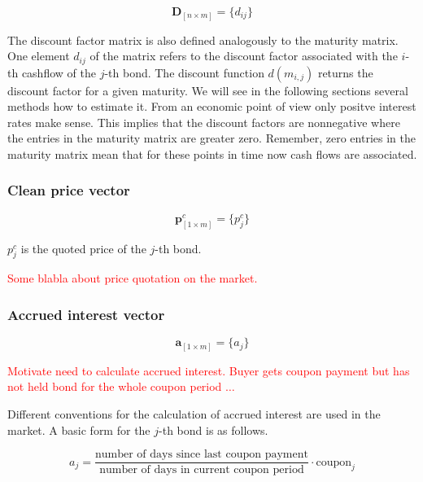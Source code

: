  \begin{equation}\label{discountm}
\bm{D}_{\left[n\times m\right]}= \{d_{ij}\}
\end{equation}

The discount factor matrix is also defined analogously to the maturity matrix. One element $d_{ij}$ of the matrix refers to the discount factor associated with  the $i$-th cashflow of the $j$-th bond. The discount function $d(m_{i,j})$ returns the discount factor for a given maturity. We will see in the following sections several methods how to estimate it. From an economic point of view only positve interest rates make sense. This implies that the discount factors are nonnegative where the entries in the maturity matrix are greater zero. Remember, zero entries in the maturity matrix mean that for these points in time now cash flows are associated.

\subsubsection*{Clean price vector}

 \begin{equation}\label{pc}
\bm{p}^c_{\left[1\times m\right]}= \{p^c_j\}
\end{equation}

$p_{j}^c$ is the quoted price of the $j$-th bond.

\textcolor{red}{Some blabla about price quotation on the market.}

\subsubsection*{Accrued interest vector}

  \begin{equation}\label{a}
\bm{a}_{\left[1\times m\right]}= \{a_j\}
\end{equation}


\textcolor{red}{Motivate need to calculate accrued interest. Buyer gets coupon payment but has not held bond for the whole coupon period $\dots$}

Different conventions for the calculation of accrued interest are used in the market. A basic form for the $j$-th bond is as follows.

\begin{equation}
    a_j= \frac{\mbox{number of days since last coupon payment}}{\mbox{number of days in current coupon period}}\cdot \mbox{coupon}_j
\end{equation}
 	

